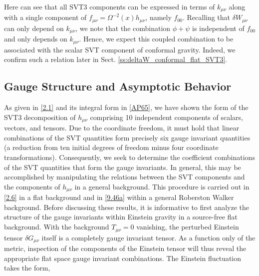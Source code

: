 %
Here can see that all SVT3 components can be expressed in terms of $k_{\mu\nu}$ along with a single component of $f_{\mu\nu}=\Omega^{-2}(x)h_{\mu\nu}$, namely $f_{00}$.  Recalling that $\delta W_{\mu\nu}$ can only depend on $k_{\mu\nu}$, we note that the combination $\phi+\psi$ is independent of $f_{00}$ and only depends on $k_{\mu\nu}$. Hence, we expect this coupled combination to be associated with the scalar SVT component of conformal gravity. Indeed, we confirm such a relation later in Sect. \ref{ss:deltaW_conformal_flat_SVT3}.

\subsection{Gauge Structure and Asymptotic Behavior}
\label{ss:gauge_struct_svt3}
As given in \eqref{2.1} and its integral form in \eqref{AP65}, we have shown the form of the SVT3 decomposition of $h_{\mu\nu}$ comprising 10 independent components of scalars, vectors, and tensors. Due to the coordinate freedom, it must hold that linear combinations of the SVT quantities form precisely six gauge invariant quantities (a reduction from ten initial degrees of freedom minus four coordinate transformations). Consequently, we seek to determine the coefficient combinations of the SVT quantities that form the gauge invariants. In general, this may be accomplished by manipulating the relations between the SVT components and the components of $h_{\mu\nu}$ in a general background. This procedure is carried out in \eqref{2.6} in a flat background and in \eqref{9.46a} within a general Roberston Walker background. Before discussing these results, it is informative to first analyze the structure of the gauge invariants within Einstein gravity in a source-free flat background. With the background $T_{\mu\nu}=0$ vanishing, the perturbed Einstein tensor $\delta G_{\mu\nu}$ itself is a completely gauge invariant tensor. As a function only of the metric, inspection of the components of the Einstein tensor will thus reveal the appropriate flat space gauge invariant combinations. The Einstein fluctuation takes the form,
%
